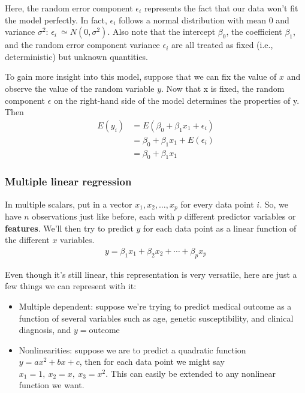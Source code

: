\documentclass[a4paper]{article}
\numberwithin{equation}{section}
\begin{document}
Here, the random error component \(\epsilon_i\) represents the fact that our data won’t fit the model perfectly. In fact,
\(\epsilon_i\) follows a normal distribution with mean \(0\) and variance \(\sigma^2\): \(\epsilon_i\ \simeq N (0, \sigma^2)\).
Also note that the intercept \(\beta_0\), the coefficient \(\beta_1\), and the random error component variance \(\epsilon_i\) are all treated as fixed (i.e., deterministic) but unknown quantities.

To gain more insight into this model, suppose that we can fix the value of \(x\) and observe the value of the random variable \(y\).
Now that x is fixed, the random component \(\epsilon \) on the right-hand side of the model determines the properties of y.
Then
\begin{align*}
  E(y_i) & = E(\beta_0 + \beta_1x_1 + \epsilon_i) \\
         & = \beta_0 + \beta_1x_1 + E(\epsilon_i) \\
         & = \beta_0 + \beta_1x_1
\end{align*}

\subsubsection{Multiple linear regression}
In multiple scalars, put in a vector \(x_1, x_2, \dots, x_p\) for every data point \(i\). So, we have \(n\) observations just like before, each with \(p\) different predictor variables or \textbf{features}. We'll then try to predict \(y\) for each data point as a linear function of the different \(x\) variables.
\begin{align*}
  y = \beta_1 x_1 + \beta_2 x_2 + \cdots + \beta_p x_p
\end{align*}

Even though it's still linear, this representation is very versatile, here are just a few things we can represent with it:
\begin{itemize}
  \item Multiple dependent: suppose we're trying to predict medical outcome as a function of several variables such as age, genetic susceptibility, and clinical diagnosis, and \(y = \text{outcome}\)
  \item Nonlinearities: suppose we are to predict a quadratic function \(y = ax^2 + bx + c\), then for each data point we might say \(x_1 = 1,\ x_2 = x,\ x_3 = x^2\). This can easily be extended to any nonlinear function we want.
\end{itemize}
\end{document}
